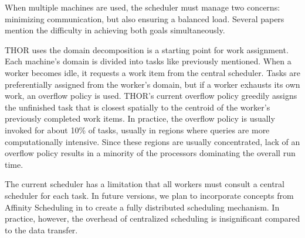 \documentclass[twoside,leqno,twocolumn]{article}
\newcommand{\authornote}[1]{\footnote{Note to self: #1}}
\newcommand{\authorsnote}[1]{\authornote{#1}}
\begin{document}
When multiple machines are used, the scheduler must manage two concerns: minimizing communication, but also ensuring a balanced load.
Several papers \cite{markatos92using, salmon_thesis} mention the difficulty in achieving both goals simultaneously.

THOR uses the domain decomposition is a starting point for work assignment.
Each machine's domain is divided into tasks like previously mentioned.
When a worker becomes idle, it requests a work item from the central scheduler.
Tasks are preferentially assigned from the worker's domain, but if a worker exhausts its own work, an overflow policy is used.
THOR's current overflow policy greedily assigns the unfinished task that is closest spatially to the centroid of the worker's previously completed work items.
In practice, the overflow policy is usually invoked for about 10\% of tasks, usually in regions where queries are more computationally intensive.
Since these regions are usually concentrated, lack of an overflow policy results in a minority of the processors dominating the overall run time.

The current scheduler has a limitation that all workers must consult a central scheduler for each task.
In future versions, we plan to incorporate concepts from Affinity Scheduling in \cite{markatos92using} to create a fully distributed scheduling mechanism.
In practice, however, the overhead of centralized scheduling is insignificant compared to the data transfer.



\end{document}
